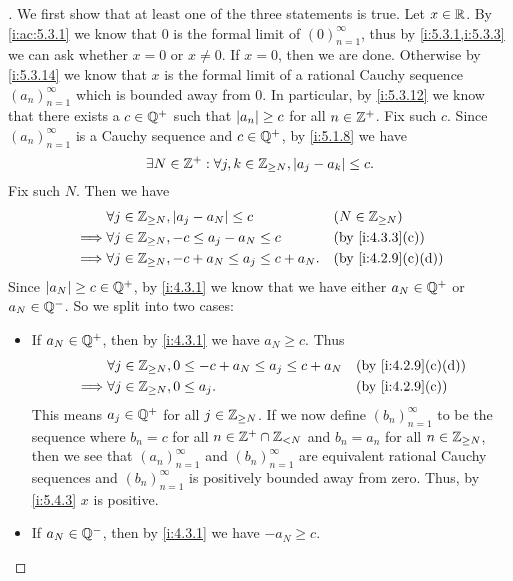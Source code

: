 \begin{proof}[]
  We first show that at least one of the three statements is true.
  Let \(x \in \mathbb{R}\).
  By \cref{i:ac:5.3.1} we know that \(0\) is the formal limit of \((0)_{n = 1}^\infty\), thus by \cref{i:5.3.1,i:5.3.3} we can ask whether \(x = 0\) or \(x \neq 0\).
  If \(x = 0\), then we are done.
  Otherwise by \cref{i:5.3.14} we know that \(x\) is the formal limit of a rational Cauchy sequence \((a_n)_{n = 1}^\infty\) which is bounded away from \(0\).
  In particular, by \cref{i:5.3.12} we know that there exists a \(c \in \mathbb{Q}^+\) such that \(\left\lvert a_n\right\rvert \geq c\) for all \(n \in \mathbb{Z}^+\).
  Fix such \(c\).
  Since \((a_n)_{n = 1}^{\infty}\) is a Cauchy sequence and \(c \in \mathbb{Q}^+\), by \cref{i:5.1.8} we have
  \[
    \exists N \in \mathbb{Z}^+ : \forall j, k \in \mathbb{Z}_{\geq N}, \left\lvert a_j - a_k\right\rvert \leq c.
  \]
  Fix such \(N\).
  Then we have
  \begin{align*}
             & \forall j \in \Z_{\geq N}, \abs{a_j - a_N} \leq c          &  & (N \in \Z_{\geq N}) \\
    \implies & \forall j \in \Z_{\geq N}, -c \leq a_j - a_N \leq c        &  & \by{i:4.3.3}[c]     \\
    \implies & \forall j \in \Z_{\geq N}, -c + a_N \leq a_j \leq c + a_N. &  & \by{i:4.2.9}[c,d]
  \end{align*}
  Since \(\left\lvert a_N\right\rvert \geq c \in \mathbb{Q}^+\), by \cref{i:4.3.1} we know that we have either \(a_N \in \mathbb{Q}^+\) or \(a_N \in \mathbb{Q}^-\).
  So we split into two cases:
  \begin{itemize}
    \item If \(a_N \in \mathbb{Q}^+\), then by \cref{i:4.3.1} we have \(a_N \geq c\).
          Thus
          \begin{align*}
                     & \forall j \in \Z_{\geq N}, 0 \leq -c + a_N \leq a_j \leq c + a_N &  & \by{i:4.2.9}[c,d] \\
            \implies & \forall j \in \Z_{\geq N}, 0 \leq a_j.                           &  & \by{i:4.2.9}[c]
          \end{align*}
          This means \(a_j \in \mathbb{Q}^+\) for all \(j \in \mathbb{Z}_{\geq N}\).
          If we now define \((b_n)_{n = 1}^\infty\) to be the sequence where \(b_n = c\) for all \(n \in \mathbb{Z}^+ \cap \mathbb{Z}_{< N}\) and \(b_n = a_n\) for all \(n \in \mathbb{Z}_{\geq N}\), then we see that \((a_n)_{n = 1}^\infty\) and \((b_n)_{n = 1}^\infty\) are equivalent rational Cauchy sequences and \((b_n)_{n = 1}^\infty\) is positively bounded away from zero.
          Thus, by \cref{i:5.4.3} \(x\) is positive.
    \item If \(a_N \in \mathbb{Q}^-\), then by \cref{i:4.3.1} we have \(-a_N \geq c\).

\end{itemize}
\end{proof}
